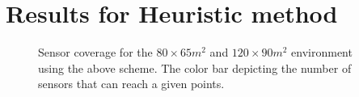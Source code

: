 \documentclass{article}
\begin{document}
\section{Results for Heuristic method}

\begin{figure}
	\centering
	\caption{Sensor coverage for the $80 \times 65 m^2$ and $120 \times 90 m^2$ environment using the above scheme. The color bar depicting the number of sensors that can reach a given points.}
	\label{fig:uwb-c}
\end{figure}
\end{document}
